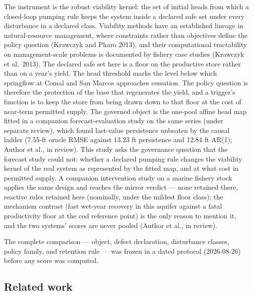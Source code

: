 The instrument is the robust viability kernel: the set of initial heads
from which a closed-loop pumping rule keeps the system inside a declared
safe set under every disturbance in a declared class. Viability methods
have an established lineage in natural-resource management, where
constraints rather than objectives define the policy question (Krawczyk
and Pharo 2013), and their computational tractability on
management-scale problems is documented by fishery case studies
(Krawczyk et al.~2013). The declared safe set here is a floor on the
productive store rather than on a year's yield. The head threshold marks
the level below which springflow at Comal and San Marcos approaches
cessation. The policy question is therefore the protection of the base
that regenerates the yield, and a trigger's function is to keep the
store from being drawn down to that floor at the cost of near-term
permitted supply. The governed object is the one-pool affine head map
fitted in a companion forecast-evaluation study on the same series
(under separate review), which found last-value persistence unbeaten by
the causal ladder (7.55-ft oracle RMSE against 13.23 ft persistence and
12.84 ft AR(1); Author et al., in review). This study asks the
governance question that the forecast study could not: whether a
declared pumping rule changes the viability kernel of the real system as
represented by the fitted map, and at what cost in permitted supply. A
companion intervention study on a marine fishery stock applies the same
design and reaches the mirror verdict --- none retained there, reactive
rules retained here (nominally, under the mildest floor class); the
mechanism contrast (fast wet-year recovery in this aquifer against a
fatal productivity floor at the cod reference point) is the only reason
to mention it, and the two systems' scores are never pooled (Author et
al., in review).

The complete comparison --- object, defect declaration, disturbance
classes, policy family, and retention rule --- was frozen in a dated
protocol (2026-08-26) before any score was computed.

\subsection{Related work}
\label{edw-priorart}

